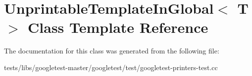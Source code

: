 \hypertarget{classUnprintableTemplateInGlobal}{}\section{Unprintable\+Template\+In\+Global$<$ T $>$ Class Template Reference}
\label{classUnprintableTemplateInGlobal}


The documentation for this class was generated from the following file\+:\begin{DoxyCompactItemize}
\item 
tests/libs/googletest-\/master/googletest/test/googletest-\/printers-\/test.\+cc\end{DoxyCompactItemize}
